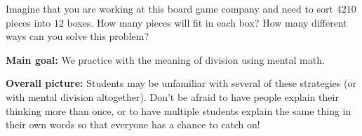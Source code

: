 \documentclass[nooutcomes,noauthor]{ximera}
\begin{document}
\begin{problem}
Imagine that you are working at this board game company and need to sort $4210$ pieces into $12$ boxes. How many pieces will fit in each box? How many different ways can you solve this problem?
\end{problem}








\newpage

\begin{instructorNotes} 



{\bf Main goal:} We practice with the meaning of division using mental math.


{\bf Overall picture:} Students may be unfamiliar with several of these strategies (or with mental division altogether). Don't be afraid to have people explain their thinking more than once, or to have multiple students explain the same thing in their own words so that everyone has a chance to catch on!


\end{instructorNotes}
\end{document}
